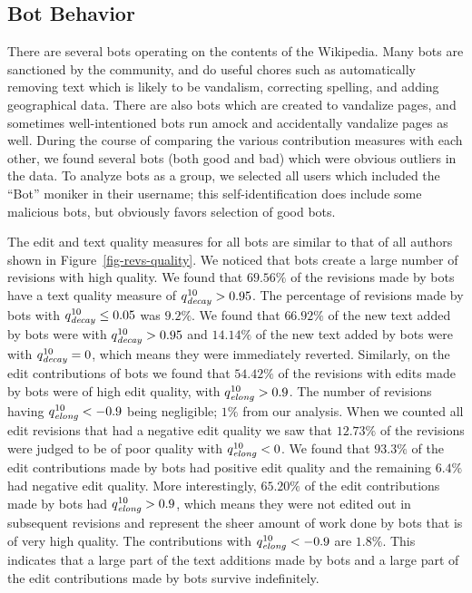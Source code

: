 \subsection{Bot Behavior}

There are several bots operating on the contents of the Wikipedia.
Many bots are sanctioned by the community, and do useful
chores such as automatically removing text which is likely
to be vandalism, correcting spelling, and adding geographical data.
There are also bots which are created to vandalize pages,
and sometimes well-intentioned bots run amock and
accidentally vandalize pages as well.
During the course of comparing the various contribution
measures with each other, we found several bots (both
good and bad) which were obvious outliers in the data.
To analyze bots as a group, we selected all users
which included the ``Bot'' moniker in their username;
this self-identification does include some malicious bots,
but obviously favors selection of good bots.

The edit and text quality measures for all bots are similar to
that of all authors shown in Figure~\ref{fig-revs-quality}.
We noticed that bots create a large number of revisions with
high quality.
We found that $69.56\%$ of the revisions made by
bots have a text quality measure of $\quality{decay}{10}{} > 0.95$.
The percentage of revisions made by bots with 
$\quality{decay}{10}{} \le 0.05$ was $9.2\%$.
We found that $66.92\%$ of the new text added by bots were with
$\quality{decay}{10}{} > 0.95$ and $14.14\%$ of the new text added by
bots were with $\quality{decay}{10}{} = 0$, which means they were 
immediately reverted.
Similarly, on the edit contributions of bots we found that
$54.42\%$ of the revisions with edits made by bots were of
high edit quality, with $\quality{elong}{10}{} > 0.9$.
The number of revisions having $\quality{elong}{10}{} < -0.9$ being
negligible; $1\%$ from our analysis.
When we counted all edit revisions that had a negative edit
quality we saw that $12.73\%$ of the revisions were judged to 
be of poor quality with $\quality{elong}{10}{} < 0$.
We found that $93.3\%$ of the edit contributions made by bots
had positive edit quality and the remaining $6.4\%$ had
negative edit quality.
More interestingly, $65.20\%$ of the edit contributions made
by bots had $\quality{elong}{10}{} > 0.9$, which means they were
not edited out in subsequent revisions and represent the
sheer amount of work done by bots that is of very high quality.
The contributions with $\quality{elong}{10}{} < -0.9$ are $1.8\%$.
This indicates that a large part of the text additions made by bots 
and a large part of the edit contributions made by bots survive
indefinitely.

